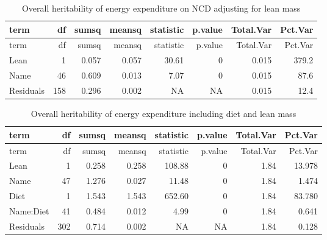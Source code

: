 \documentclass[]{article}
\newenvironment{Shaded}{\begin{snugshade}}{\end{snugshade}}
\newcommand{\DataTypeTok}[1]{\textcolor[rgb]{0.13,0.29,0.53}{#1}}
\newcommand{\DecValTok}[1]{\textcolor[rgb]{0.00,0.00,0.81}{#1}}
\newcommand{\KeywordTok}[1]{\textcolor[rgb]{0.13,0.29,0.53}{\textbf{#1}}}
\newcommand{\NormalTok}[1]{#1}
\newcommand{\OperatorTok}[1]{\textcolor[rgb]{0.81,0.36,0.00}{\textbf{#1}}}
\newcommand{\StringTok}[1]{\textcolor[rgb]{0.31,0.60,0.02}{#1}}
\begin{document}
\begin{longtable}[]{@{}lrrrrrrr@{}}
\caption{Overall heritability of energy expenditure on NCD adjusting for
lean mass}\tabularnewline
\toprule
term & df & sumsq & meansq & statistic & p.value & Total.Var &
Pct.Var\tabularnewline
\midrule
\endfirsthead
\toprule
term & df & sumsq & meansq & statistic & p.value & Total.Var &
Pct.Var\tabularnewline
\midrule
\endhead
Lean & 1 & 0.057 & 0.057 & 30.61 & 0 & 0.015 & 379.2\tabularnewline
Name & 46 & 0.609 & 0.013 & 7.07 & 0 & 0.015 & 87.6\tabularnewline
Residuals & 158 & 0.296 & 0.002 & NA & NA & 0.015 & 12.4\tabularnewline
\bottomrule
\end{longtable}

\begin{Shaded}
\end{Shaded}

\begin{longtable}[]{@{}lrrrrrrr@{}}
\caption{Overall heritability of energy expenditure including diet and
lean mass}\tabularnewline
\toprule
term & df & sumsq & meansq & statistic & p.value & Total.Var &
Pct.Var\tabularnewline
\midrule
\endfirsthead
\toprule
term & df & sumsq & meansq & statistic & p.value & Total.Var &
Pct.Var\tabularnewline
\midrule
\endhead
Lean & 1 & 0.258 & 0.258 & 108.88 & 0 & 1.84 & 13.978\tabularnewline
Name & 47 & 1.276 & 0.027 & 11.48 & 0 & 1.84 & 1.474\tabularnewline
Diet & 1 & 1.543 & 1.543 & 652.60 & 0 & 1.84 & 83.780\tabularnewline
Name:Diet & 41 & 0.484 & 0.012 & 4.99 & 0 & 1.84 & 0.641\tabularnewline
Residuals & 302 & 0.714 & 0.002 & NA & NA & 1.84 & 0.128\tabularnewline
\bottomrule
\end{longtable}
\end{document}
